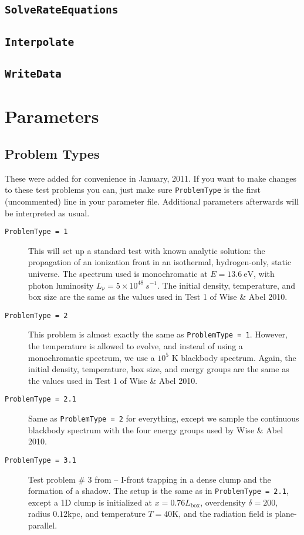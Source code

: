 \documentclass[letterpaper,titlepage,12pt]{article}
\numberwithin{equation}{section}
\begin{document}
\subsection{\texttt{SolveRateEquations}}
\subsection{\texttt{Interpolate}}
\subsection{\texttt{WriteData}}

\section{Parameters}

\subsection{Problem Types}
These were added for convenience in January, 2011.  If you want to make changes to these test problems you can, just make sure \texttt{ProblemType} is the first (uncommented) line in your parameter file.  Additional parameters afterwards will be interpreted as usual.

\begin{description}
    
\item [\texttt{ProblemType = 1}] This will set up a standard test with known analytic solution: the propagation of an ionization front in an isothermal, hydrogen-only, static universe.  The spectrum used is monochromatic at $E = 13.6 \ \text{eV}$, with photon luminosity $L_{\nu} = 5\times 10^{48} \ s^{-1}$.  The initial density, temperature, and box size are the same as the values used in Test 1 of Wise \& Abel 2010. 

\item [\texttt{ProblemType = 2}] This problem is almost exactly the same as \texttt{ProblemType = 1}.  However, the temperature is allowed to evolve, and instead of using a monochromatic spectrum, we use a $10^5$ K blackbody spectrum.  Again, the initial density, temperature, box size, and energy groups are the same as the values used in Test 1 of Wise \& Abel 2010.  

\item [\texttt{ProblemType = 2.1}] Same as \texttt{ProblemType = 2} for everything, except we sample the continuous blackbody spectrum with the four energy groups used by Wise \& Abel 2010.

\item [\texttt{ProblemType = 3.1}] Test problem \# 3 from \cite{Iliev2006} -- I-front trapping in a dense clump and the formation of a shadow.  The setup is the same as in \texttt{ProblemType = 2.1}, except a 1D clump is initialized at $x = 0.76 L_{\mathrm{box}}$, overdensity $\delta = 200$, radius $0.12$kpc, and temperature $T = 40$K, and the radiation field is plane-parallel.
\end{description}
\end{document}
